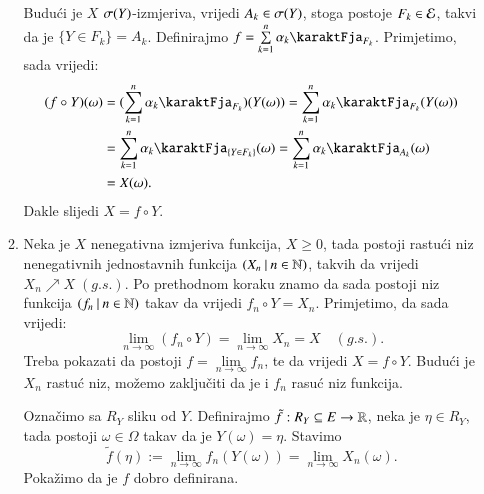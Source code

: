 \begin{rj}[\ref{zad:3.20}]
\begin{itemize}
\begin{enumerate}[label=(\arabic*. korak)]
            Budu\' ci je $X$ $\sigma({Y})$-izmjeriva, vrijedi $A_k \in \sigma({Y})$, stoga postoje $F_k \in \mathcal{E}$, takvi da je $\{Y \in F_k\} = A_k$.
            Definirajmo $f = \suma{k = 1}{n} \alpha_k \karaktFja_{F_k}$.
            Primjetimo, sada vrijedi:
            \begin{equation*}
                \begin{aligned}
                    (f \circ Y)(\omega) &= (\suma{k = 1}{n} \alpha_k \karaktFja_{F_k})(Y(\omega)) = \suma{k = 1}{n} \alpha_k \karaktFja_{F_k} (Y(\omega))\\
                    &= \suma{k = 1}{n} \alpha_k \karaktFja_{\{Y \in F_k\}} (\omega) = \suma{k = 1}{n} \alpha_k \karaktFja_{A_k} (\omega)\\
                    &= X (\omega).
                \end{aligned}
            \end{equation*}
            Dakle slijedi $X = f \circ Y$.
            \item Neka je $X$ nenegativna izmjeriva funkcija, $X \geq 0$, tada postoji rastu\' ci niz nenegativnih jednostavnih funkcija $({X_n} \: | \: {n \in \mathbb{N}})$, takvih da vrijedi $X_n \nearrow X \; (g.s.)$.
            Po prethodnom koraku znamo da sada postoji niz funkcija $({f_n} \: | \: {n \in \mathbb{N}})$ takav da vrijedi $f_n \circ Y = X_n$.
            Primjetimo, da sada vrijedi:
            \begin{equation*}
                \lim\limits_{n \to \infty} (f_n \circ Y) = \lim\limits_{n \to \infty} X_n = X \quad (g.s.).
            \end{equation*}
            Treba pokazati da postoji $f = \lim\limits_{n \to \infty} f_n$, te da vrijedi $X = f \circ Y$.
            Budu\' ci je $X_n$ rastu\' c niz, mo\v zemo zaklju\v citi da je i $f_n$ rasu\' c niz funkcija.

            Ozna\v cimo sa $R_Y$ sliku od $Y$.
            Definirajmo $\tilde{f} : R_Y \subseteq E \to \mathbb{R}$, neka je $\eta \in R_Y$, tada postoji $\omega \in \Omega$ takav da je $Y(\omega) = \eta$. 
            Stavimo
            \begin{equation*}
                \tilde{f} (\eta) := \lim\limits_{n \to \infty} f_n (Y(\omega)) = \lim\limits_{n \to \infty} X_n (\omega).
            \end{equation*}
            Poka\v zimo da je $f$ dobro definirana.


\end{enumerate}
\end{itemize}
\end{rj}

